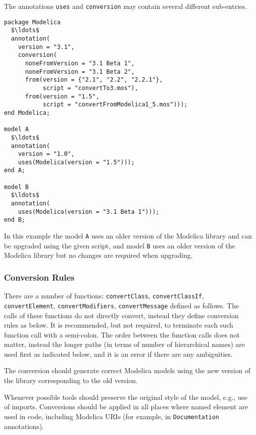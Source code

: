 The annotations \lstinline!uses! and \lstinline!conversion! may contain several different sub-entries.

\begin{example}
\begin{lstlisting}[language=modelica]
package Modelica
  $\ldots$
  annotation(
    version = "3.1",
    conversion(
      noneFromVersion = "3.1 Beta 1",
      noneFromVersion = "3.1 Beta 2",
      from(version = {"2.1", "2.2", "2.2.1"},
           script = "convertTo3.mos"),
      from(version = "1.5",
           script = "convertFromModelica1_5.mos")));
end Modelica;

model A
  $\ldots$
  annotation(
    version = "1.0",
    uses(Modelica(version = "1.5")));
end A;

model B
  $\ldots$
  annotation(
    uses(Modelica(version = "3.1 Beta 1")));
end B;
\end{lstlisting}
In this example the model \lstinline!A! uses an older version of the Modelica library and can be upgraded using the given script, and model \lstinline!B! uses an older version of the Modelica library but no changes are required when upgrading.
\end{example}

\subsubsection{Conversion Rules}\label{conversion-rules}

There are a number of functions: \lstinline!convertClass!, \lstinline!convertClassIf!, \lstinline!convertElement!, \mbox{\lstinline!convertModifiers!,} \lstinline!convertMessage! defined as follows.
The calls of these functions do not directly convert, instead they define conversion rules as below.
It is recommended, but not required, to terminate each such function call with a semi-colon.
The order between the function calls does not matter, instead the longer paths (in terms of number of hierarchical names) are used first as indicated below, and it is an error if there are any ambiguities.

The conversion should generate correct Modelica models using the new version of the library corresponding to the old version.

\begin{nonnormative}
Whenever possible tools should preserve the original style of the model, e.g., use of imports.
Conversions should be applied in all places where named element are used in code, including Modelica URIs (for example, in \lstinline!Documentation! annotations).
\end{nonnormative}

